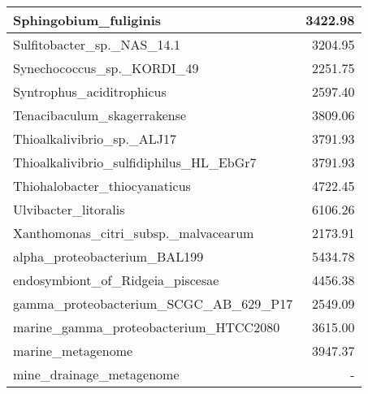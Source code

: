 \documentclass[12pt,a4paper]{article}
\begin{document}
\begin{table}[ht]
\begin{center}
\begin{tabular}{|l*{1}{|r}|}
Sphingobium\_fuliginis & 3422.98 \\ \hline
Sulfitobacter\_sp.\_NAS\_14.1 & 3204.95 \\ \hline
Synechococcus\_sp.\_KORDI\_49 & 2251.75 \\ \hline
Syntrophus\_aciditrophicus & 2597.40 \\ \hline
Tenacibaculum\_skagerrakense & 3809.06 \\ \hline
Thioalkalivibrio\_sp.\_ALJ17 & 3791.93 \\ \hline
Thioalkalivibrio\_sulfidiphilus\_HL\_EbGr7 & 3791.93 \\ \hline
Thiohalobacter\_thiocyanaticus & 4722.45 \\ \hline
Ulvibacter\_litoralis & 6106.26 \\ \hline
Xanthomonas\_citri\_subsp.\_malvacearum & 2173.91 \\ \hline
alpha\_proteobacterium\_BAL199 & 5434.78 \\ \hline
endosymbiont\_of\_Ridgeia\_piscesae & 4456.38 \\ \hline
gamma\_proteobacterium\_SCGC\_AB\_629\_P17 & 2549.09 \\ \hline
marine\_gamma\_proteobacterium\_HTCC2080 & 3615.00 \\ \hline
marine\_metagenome & 3947.37 \\ \hline
mine\_drainage\_metagenome & - \\ \hline
\end{tabular}
\end{center}
\end{table}
\end{document}
